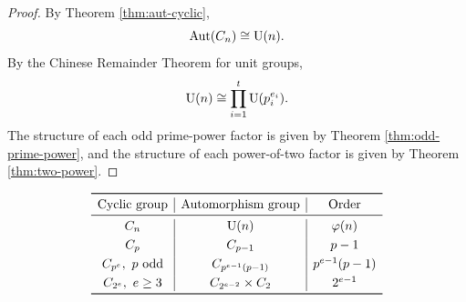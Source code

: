 \begin{proof}
By Theorem \ref{thm:aut-cyclic},
\[
    \operatorname{Aut}(C_n)\cong\mathrm{U}(n).
\]
By the Chinese Remainder Theorem for unit groups,
\[
    \mathrm{U}(n)
    \cong
    \prod_{i=1}^t \mathrm{U}(p_i^{e_i}).
\]
The structure of each odd prime-power factor is given by Theorem \ref{thm:odd-prime-power}, and the structure of each power-of-two factor is given by Theorem \ref{thm:two-power}.
\end{proof}

\begin{remark}
\[
\begin{array}{c|c|c}
\toprule
\text{Cyclic group} & \text{Automorphism group} & \text{Order}\\
\midrule
C_n
&
\Unit(n)
&
\varphi(n)
\\[3pt]
C_p
&
C_{p-1}
&
p-1
\\[3pt]
C_{p^e},\ p\text{ odd}
&
C_{p^{e-1}(p-1)}
&
p^{e-1}(p-1)
\\[3pt]
C_{2^e},\ e\geq3
&
C_{2^{e-2}}\times C_2
&
2^{e-1}
\\
\bottomrule
\end{array}
\]
\end{remark}

